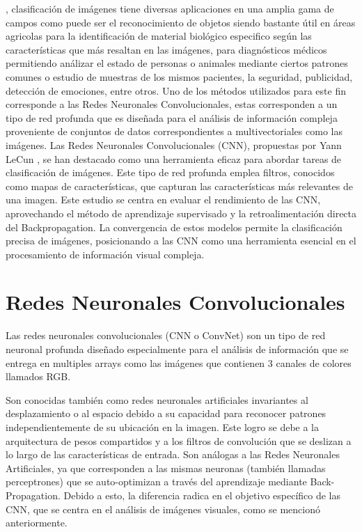 \documentclass[journal]{IEEEtai}
\begin{document}
, clasificación de imágenes tiene diversas aplicaciones en una amplia gama de campos como puede ser el reconocimiento de objetos siendo bastante útil en áreas agricolas para la identificación de material biológico especifico  según las características que más resaltan en las imágenes, para diagnósticos médicos permitiendo análizar el estado de personas o animales mediante ciertos patrones comunes o estudio de muestras de los mismos pacientes, la seguridad, publicidad, detección de emociones, entre otros. Uno de los métodos utilizados para este fin corresponde a las Redes Neuronales Convolucionales, estas corresponden a un tipo de red profunda que es diseñada para el análisis de información compleja proveniente de conjuntos de datos correspondientes a multivectoriales como las imágenes.
Las Redes Neuronales Convolucionales (CNN), propuestas por Yann LeCun \cite{CNN}, se han destacado como una herramienta eficaz para abordar tareas de clasificación de imágenes. Este tipo de red profunda emplea filtros, conocidos como mapas de características, que capturan las características más relevantes de una imagen. Este estudio se centra en evaluar el rendimiento de las CNN, aprovechando el método de aprendizaje supervisado y la retroalimentación directa del Backpropagation. La convergencia de estos modelos permite la clasificación precisa de imágenes, posicionando a las CNN como una herramienta esencial en el procesamiento de información visual compleja.



\section{Redes Neuronales Convolucionales}

Las redes neuronales convolucionales (CNN o ConvNet) son un tipo de red neuronal profunda diseñado especialmente para el análisis de información que se entrega en multiples arrays como las imágenes que contienen 3 canales de colores llamados RGB.  

Son conocidas también como redes neuronales artificiales invariantes al desplazamiento o al espacio debido a su capacidad para reconocer patrones independientemente de su ubicación en la imagen. Este logro se debe a la arquitectura de pesos compartidos y a los filtros de convolución que se deslizan a lo largo de las características de entrada. Son análogas a las Redes Neuronales Artificiales, ya que corresponden a las mismas neuronas (también llamadas perceptrones) que se auto-optimizan a través del aprendizaje mediante Back-Propagation. Debido a esto, la diferencia radica en el objetivo específico de las CNN, que se centra en el análisis de imágenes visuales, como se mencionó anteriormente.
\end{document}

